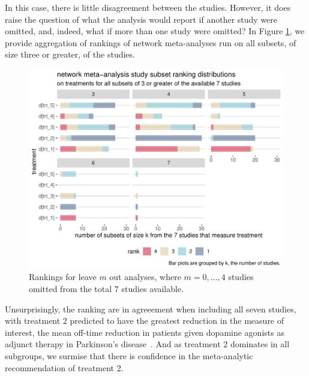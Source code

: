 \documentclass[12pt]{article}\usepackage[]{graphicx}\usepackage[]{color}
\makeatletter
\def\maxwidth{ %
  \ifdim\Gin@nat@width>\linewidth
    \linewidth
  \else
    \Gin@nat@width
  \fi
}
\newenvironment{knitrout}{}{} %
\makeatother
\begin{document}
In this case, there is little disagreement between the studies. However, it does raise the question of what the analysis would report if another study were omitted, and, indeed, what if more than one study were omitted? In Figure \ref{fig:leavem}, we provide aggregation of rankings of network meta-analyses run on all subsets, of size three or greater, of the studies.











\begin{figure}
\centering
\begin{knitrout}
\color{fgcolor}
\includegraphics[width=\maxwidth]{figure/leavem-1} 

\end{knitrout}

\caption{Rankings for leave $m$ out analyses, where $m = 0, \dots, 4$ studies omitted from the total 7 studies available.}
\label{fig:leavem}
\end{figure}

Unsurprisingly, the ranking are in agreeement when including all seven studies, with treatment 2 predicted to have the greatest reduction in the measure of interest, the mean off-time reduction in patients given dopamine agonists as adjunct therapy in Parkinson's disease~\cite{phillippo_multinma_2020}. And as treatment 2 dominates in all subgroups, we surmise that there is confidence in the meta-analytic recommendation of treatment 2.
\end{document}
